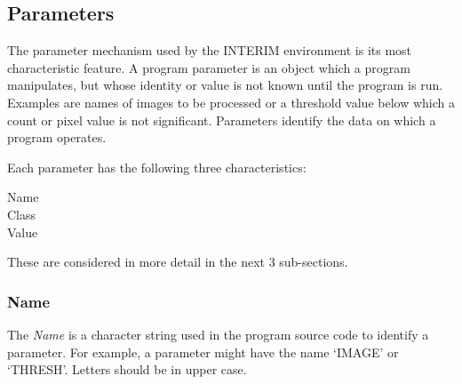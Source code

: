 \documentclass{article}
\begin{document}
\subsection {Parameters}
The parameter mechanism used by the INTERIM environment is its most
characteristic feature.
A program parameter is an object which a program manipulates, but whose
identity or value is not known until the program is run.
Examples are names of images to be processed or a threshold value below
which a count or pixel value is not significant.
Parameters identify the data on which a program operates.

Each parameter has the following three characteristics:
\begin{description}
\item [Name]
\item [Class]
\item [Value]
\end{description}
These are considered in more detail in the next 3 sub-sections.
\subsubsection {Name}
The {\em Name} is a character string used in the program source code to
identify a parameter.
For example, a parameter might have the name `IMAGE' or `THRESH'.
Letters should be in upper case.
\end{document}
